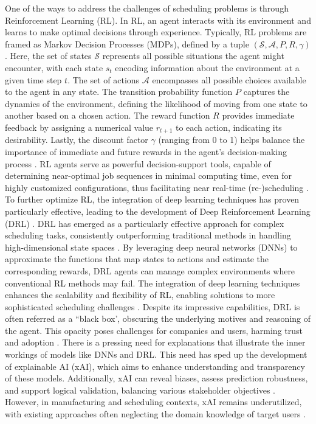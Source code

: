 One of the ways to address the challenges of scheduling problems is through Reinforcement Learning (RL). In RL, an agent interacts with its environment and learns to make optimal decisions through experience. Typically, RL problems are framed as Markov Decision Processes (MDPs), defined by a tuple \((\mathcal{S}, \mathcal{A}, P, R, \gamma)\). Here, the set of states \(\mathcal{S}\) represents all possible situations the agent might encounter, with each state \(s_t\) encoding information about the environment at a given time step \(t\). The set of actions \(\mathcal{A}\) encompasses all possible choices available to the agent in any state. The transition probability function \(P\) captures the dynamics of the environment, defining the likelihood of moving from one state to another based on a chosen action. The reward function \(R\) provides immediate feedback by assigning a numerical value \(r_{t+1}\) to each action, indicating its desirability. Lastly, the discount factor \(\gamma\) (ranging from 0 to 1) helps balance the importance of immediate and future rewards in the agent's decision-making process . RL agents serve as powerful decision-support tools, capable of determining near-optimal job sequences in minimal computing time, even for highly customized configurations, thus facilitating near real-time (re-)scheduling . To further optimize RL, the integration of deep learning techniques has proven particularly effective, leading to the development of Deep Reinforcement Learning (DRL) .
DRL has emerged as a particularly effective approach for complex scheduling tasks, consistently outperforming traditional methods in handling high-dimensional state spaces . By leveraging deep neural networks (DNNs) to approximate the functions that map states to actions and estimate the corresponding rewards, DRL agents can manage complex environments where conventional RL methods may fail. The integration of deep learning techniques enhances the scalability and flexibility of RL, enabling solutions to more sophisticated scheduling challenges . Despite its impressive capabilities, DRL is often referred as a ``black box', obscuring the underlying motives and reasoning of the agent. This opacity poses challenges for companies and users, harming trust and adoption .
There is a pressing need for explanations that illustrate the inner workings of models like DNNs and DRL. This need has sped up the development of explainable AI (xAI), which aims to enhance understanding and transparency of these models. Additionally, xAI can reveal biases, assess prediction robustness, and support logical validation, balancing various stakeholder objectives . However, in manufacturing and scheduling contexts, xAI remains underutilized, with existing approaches often neglecting the domain knowledge of target users .
